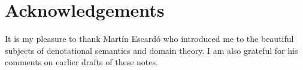 \chapter{Acknowledgements}

It is my pleasure to thank Mart\'in Escard\'o who introduced me to the beautiful
subjects of denotational semantics and domain theory. I am also grateful for his
comments on earlier drafts of these notes.


